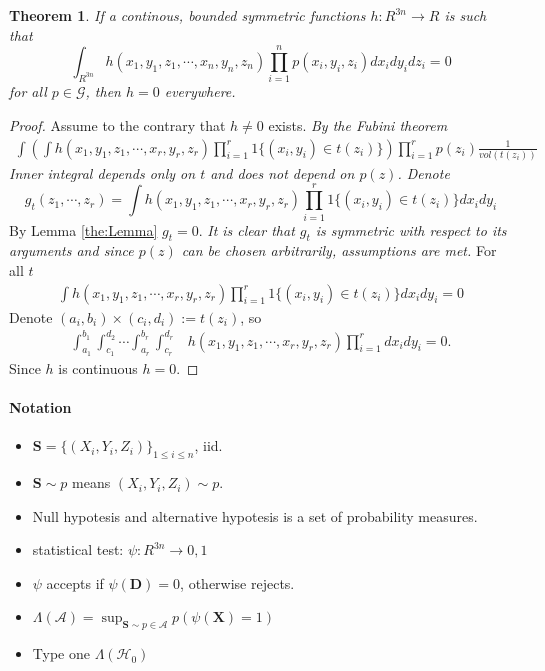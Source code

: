 \documentclass{article}
\newtheorem{Theorem}{Theorem}
\begin{document}
\begin{Theorem}
\label{th:1}
If a continous, bounded symmetric functions $h : R^{3n} \to R$ is such that 
\[
 \int_{R^{3n}} h(x_1,y_1,z_1,\cdots,x_n,y_n,z_n) \prod_{i=1}^n p(x_i,y_i,z_i) d x_i d y_i d z_i = 0
\]
for all $p \in \mathcal G$, then $h=0$ everywhere.
\end{Theorem}

\begin{proof}
Assume to the contrary that  $h \neq 0$ exists. 
\textit{ \color{ForestGreen}  By the Fubini theorem  }
\begin{align}
\int  \left( \int h(x_1,y_1,z_1,\cdots, x_r,y_r,z_r) \prod_{i=1}^r 1\{ (x_i,y_i) \in t(z_i) \}   \right) \prod_{i=1}^r  p(z_i) \frac{1}{vol(t(z_i))}
\end{align}
\textit{ \color{ForestGreen}  Inner integral depends only on $t$ and does not depend on $p(z)$. Denote }
\[
g_{t}( z_1,\cdots,z_r)  = \int h(x_1,y_1,z_1,\cdots, x_r,y_r,z_r) \prod_{i=1}^r 1\{ (x_i,y_i) \in t(z_i) \} dx_i dy_i 
\]
 By Lemma \ref{the:Lemma} $g_t=0$.  
 \textit{ \color{ForestGreen}  It is clear that  $g_{t}$ is symmetric with respect to its arguments and since $p(z)$ can be chosen arbitrarily, assumptions are met.}  For all  $t$
\begin{align}
\int h(x_1,y_1,z_1,\cdots, x_r,y_r,z_r) \prod_{i=1}^r 1\{ (x_i,y_i) \in t(z_i) \} dx_i dy_i  =  0
\end{align}
Denote $(a_i,b_i) \times (c_i,d_i):= t(z_i)$, so
\begin{align}
\int_{a_1}^{b_1} \int_{c_1}^{d_2} \cdots \int_{a_r}^{b_r} \int_{c_r}^{d_r}& h(x_1,y_1,z_1, \cdots, x_r,y_r,z_r) \prod_{i=1}^{r}  dx_i dy_i = 0.
\end{align}
Since $h$ is continuous $h=0$.
\end{proof}




\paragraph{Notation}
\begin{itemize}
 \item $\mathbf S = \{ (X_i,Y_i,Z_i) \}_{1 \leq i \leq n}$, iid.
 \item  $\mathbf S \sim p$ means $(X_i,Y_i,Z_i) \sim p$. 
 \item Null hypotesis and alternative hypotesis is a set of probability measures.
 \item statistical test: $\psi: R^{3n} \to {0,1}$
 \item $\psi$ accepts if $\psi(\mathbf D) = 0$, otherwise rejects.
 \item $\Lambda(\mathcal{A}) =  \sup_{\mathbf{S} \sim p \in \mathcal{A} }   p( \psi(\mathbf X) =1 )$
 \item Type one $\Lambda(\mathcal{H}_0)$
\end{itemize}
 
\end{document}
